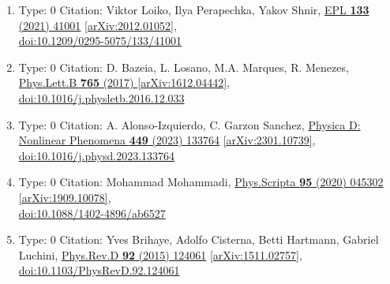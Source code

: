 \documentclass[a4paper,10pt]{article}
\begin{document}
\begin{enumerate}
\begin{enumerate}
  \item Type: 0 Citation: Viktor Loiko, Ilya Perapechka, Yakov Shnir, \href{https://www.doi.org/10.1209/0295-5075/133/41001}{EPL {\bf 133} (2021) 41001}  \href{https://arxiv.org/abs/2012.01052}{[arXiv:2012.01052]},\\\href{https://www.doi.org/10.1209/0295-5075/133/41001}{doi:10.1209/0295-5075/133/41001}
  \item Type: 0 Citation: D. Bazeia, L. Losano, M.A. Marques, R. Menezes, \href{https://www.doi.org/10.1016/j.physletb.2016.12.033}{Phys.Lett.B {\bf 765} (2017) }  \href{https://arxiv.org/abs/1612.04442}{[arXiv:1612.04442]},\\\href{https://www.doi.org/10.1016/j.physletb.2016.12.033}{doi:10.1016/j.physletb.2016.12.033}
  \item Type: 0 Citation: A. Alonso-Izquierdo, C. Garzon Sanchez, \href{https://www.doi.org/10.1016/j.physd.2023.133764}{Physica D: Nonlinear Phenomena {\bf 449} (2023) 133764}  \href{https://arxiv.org/abs/2301.10739}{[arXiv:2301.10739]},\\\href{https://www.doi.org/10.1016/j.physd.2023.133764}{doi:10.1016/j.physd.2023.133764}
  \item Type: 0 Citation: Mohammad Mohammadi, \href{https://www.doi.org/10.1088/1402-4896/ab6527}{Phys.Scripta {\bf 95} (2020) 045302}  \href{https://arxiv.org/abs/1909.10078}{[arXiv:1909.10078]},\\\href{https://www.doi.org/10.1088/1402-4896/ab6527}{doi:10.1088/1402-4896/ab6527}
  \item Type: 0 Citation: Yves Brihaye, Adolfo Cisterna, Betti Hartmann, Gabriel Luchini, \href{https://www.doi.org/10.1103/PhysRevD.92.124061}{Phys.Rev.D {\bf 92} (2015) 124061}  \href{https://arxiv.org/abs/1511.02757}{[arXiv:1511.02757]},\\\href{https://www.doi.org/10.1103/PhysRevD.92.124061}{doi:10.1103/PhysRevD.92.124061}

\end{enumerate}
\end{enumerate}
\end{document}

